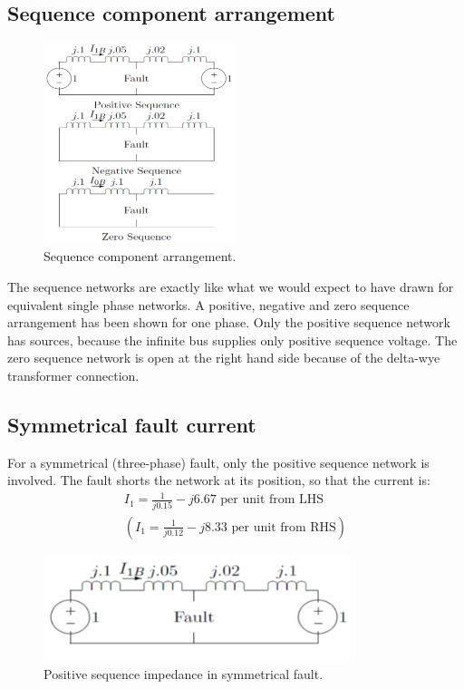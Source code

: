 \subsection{Sequence component arrangement}
\begin{figure}[H]
	\centering
	\includegraphics[width = 0.5\textwidth]{./img/figure40.png}
	\caption{Sequence component arrangement.}
\end{figure}
The sequence networks are exactly like what we would expect to have drawn for equivalent single phase networks. A positive, negative and zero sequence arrangement has been shown for one phase. Only the positive sequence network has sources, because the infinite bus supplies only positive sequence voltage. The zero sequence network is open at the right hand side because of the delta-wye transformer connection.
\subsection{Symmetrical fault current}
For a symmetrical (three-phase) fault, only the positive sequence network is involved. The fault shorts the network at its position, so that the current is:
\begin{gather}
	I_1 = \frac{1}{j0.15} - j6.67 \textrm{ per unit from LHS}\\
	(I_1 = \frac{1}{j0.12} - j8.33 \textrm{ per unit from RHS})
\end{gather}
\begin{figure}[H]
	\centering
	\includegraphics[width = 0.8\textwidth]{./img/figure41.png}
	\caption{Positive sequence impedance in symmetrical fault.}
\end{figure}
